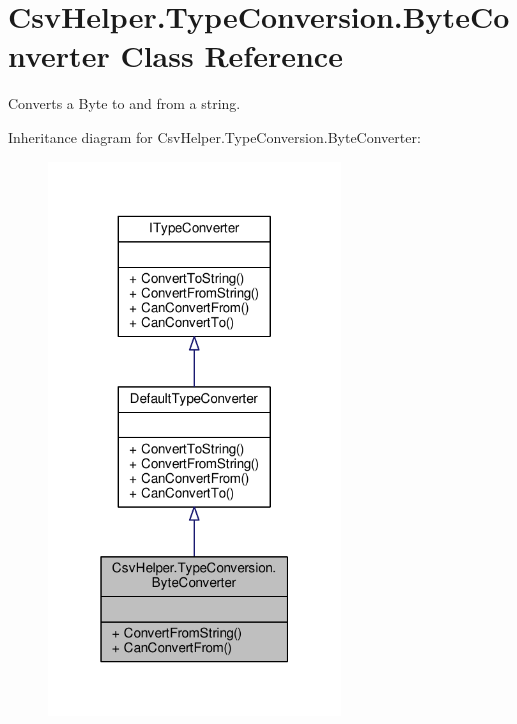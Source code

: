 \hypertarget{a00040}{\section{Csv\-Helper.\-Type\-Conversion.\-Byte\-Converter Class Reference}
\label{a00040}
}


Converts a Byte to and from a string.  




Inheritance diagram for Csv\-Helper.\-Type\-Conversion.\-Byte\-Converter\-:
\nopagebreak
\begin{figure}[H]
\begin{center}
\leavevmode
\includegraphics[width=220pt]{a00500}
\end{center}
\end{figure}


